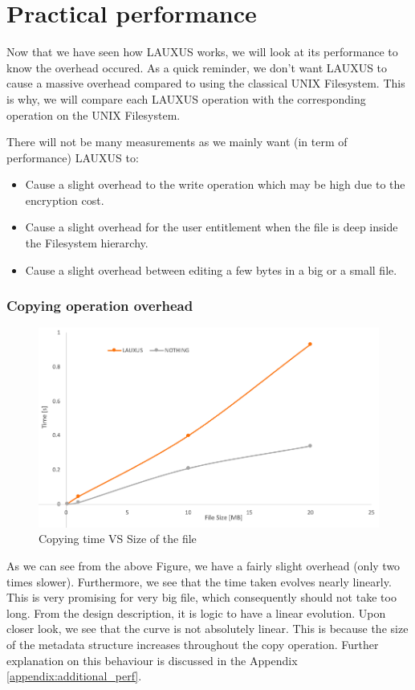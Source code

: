 \documentclass[../main.tex]{subfiles}
\begin{document}
\section{Practical performance}
\label{section:analysis:pratic_performance}
\par Now that we have seen how LAUXUS works, we will look at its performance to know the overhead occured. As a quick reminder, we don't want LAUXUS to cause a massive overhead compared to using the classical UNIX Filesystem. This is why, we will compare each LAUXUS operation with the corresponding operation on the UNIX Filesystem.
\par There will not be many measurements as we mainly want (in term of performance) LAUXUS to:
\begin{itemize}
    \item Cause a slight overhead to the write operation which may be high due to the encryption cost.
    \item Cause a slight overhead for the user entitlement when the file is deep inside the Filesystem hierarchy.
    \item Cause a slight overhead between editing a few bytes in a big or a small file.
\end{itemize}


\subsubsection{Copying operation overhead}
\label{section:analysis:write_overhead}
\begin{figure}[h]
    \centering
    \includegraphics[width=.8\textwidth]{images/analysis/perf_write_per_size}
    
    \caption{Copying time VS Size of the file}
    \label{figure:analysis:perf_write_per_size}
\end{figure}
\par As we can see from the above Figure, we have a fairly slight overhead (only two times slower).  Furthermore, we see that the time taken evolves nearly linearly. This is very promising for very big file, which consequently should not take too long. From the design description, it is logic to have a linear evolution. Upon closer look, we see that the curve is not absolutely linear. This is because the size of the metadata structure increases throughout the copy operation. Further explanation on this behaviour is discussed in the Appendix \ref{appendix:additional_perf}.
\end{document}
